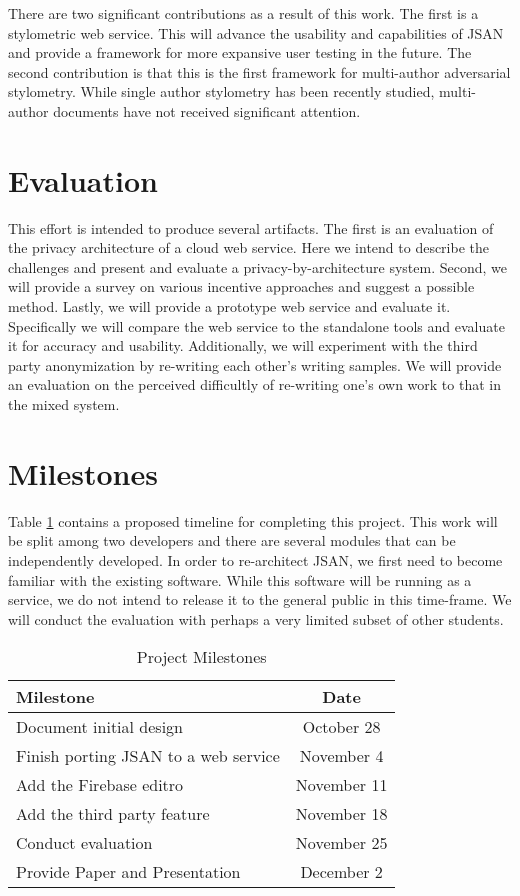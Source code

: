 \documentclass[letterpaper]{article}
\begin{document}
There are two significant contributions as a result of this work.  The
first is a stylometric web service.  This will advance the usability
and capabilities of JSAN and provide a framework for more expansive
user testing in the future.  The second contribution is that this is
the first framework for multi-author adversarial stylometry.  While
single author stylometry has been recently studied, multi-author
documents have not received significant attention.

\section*{Evaluation}\label{sec:evaluation}
This effort is intended to produce several artifacts.  The first is an
evaluation of the privacy architecture of a cloud web service.  Here
we intend to describe the challenges and present and evaluate a
privacy-by-architecture system.  Second, we will provide a survey on
various incentive approaches and suggest a possible method.  Lastly,
we will provide a prototype web service and evaluate it.  Specifically
we will compare the web service to the standalone tools and evaluate
it for accuracy and usability.  Additionally, we will experiment with
the third party anonymization by re-writing each other's writing
samples.  We will provide an evaluation on the perceived difficultly
of re-writing one's own work to that in the mixed system.


\section*{Milestones}\label{sec:milestones}

Table \ref{tab:milestones} contains a proposed timeline for completing
this project.  This work will be split among two developers and there
are several modules that can be independently developed.  In order to
re-architect JSAN, we first need to become familiar with the existing
software.  While this software will be running as a service, we do not
intend to release it to the general public in this time-frame.  We
will conduct the evaluation with perhaps a very limited subset of
other students.


\begin{table}
  \centering
  \begin{tabular}{l | c}
    Milestone & Date\\
    \hline

    Document initial design & October 28\\
    Finish porting JSAN to a web service & November 4\\
    Add the Firebase editro & November 11\\
    Add the third party feature & November 18\\
    Conduct evaluation & November 25\\
    Provide Paper and Presentation & December 2

  \end{tabular}
  \caption{Project Milestones}
  \label{tab:milestones}
\end{table}
\end{document}
